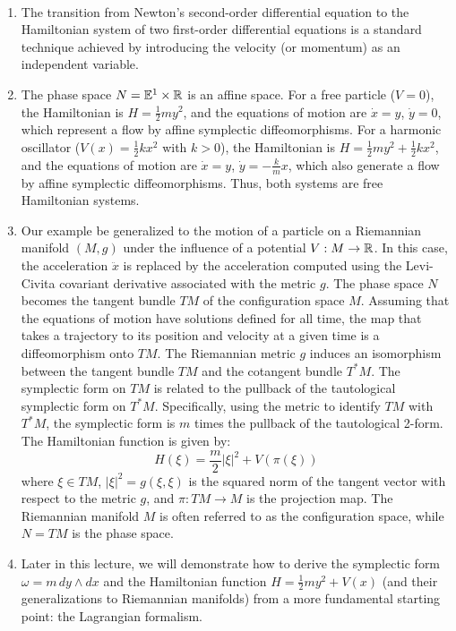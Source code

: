 \begin{remark}
\,
\begin{enumerate}
    \item The transition from Newton's second-order differential equation to the Hamiltonian system of two first-order differential equations is a standard technique achieved by introducing the velocity (or momentum) as an independent variable.
    \item The phase space $N = \mathbb{E}^1 \times \mathbb{R}$ is an affine space. For a free particle ($V=0$), the Hamiltonian is $H = \frac{1}{2}my^2$, and the equations of motion are $\dot{x} = y$, $\dot{y} = 0$, which represent a flow by affine symplectic diffeomorphisms. For a harmonic oscillator ($V(x) = \frac{1}{2}kx^2$ with $k > 0$), the Hamiltonian is $H = \frac{1}{2}my^2 + \frac{1}{2}kx^2$, and the equations of motion are $\dot{x} = y$, $\dot{y} = -\frac{k}{m}x$, which also generate a flow by affine symplectic diffeomorphisms. Thus, both systems are free Hamiltonian systems.
    \item Our example be generalized to the motion of a particle on a Riemannian manifold $(M, g)$ under the influence of a potential $V: M \rightarrow \mathbb{R}$. In this case, the acceleration $\ddot{x}$ is replaced by the acceleration computed using the Levi-Civita covariant derivative associated with the metric $g$. The phase space $N$ becomes the tangent bundle $TM$ of the configuration space $M$. Assuming that the equations of motion have solutions defined for all time, the map that takes a trajectory to its position and velocity at a given time is a diffeomorphism onto $TM$. The Riemannian metric $g$ induces an isomorphism between the tangent bundle $TM$ and the cotangent bundle $T^*M$. The symplectic form on $TM$ is related to the pullback of the tautological symplectic form on $T^*M$. Specifically, using the metric to identify $TM$ with $T^*M$, the symplectic form is $m$ times the pullback of the tautological 2-form. The Hamiltonian function is given by:
    \[ H(\xi) = \frac{m}{2} |\xi|^2 + V(\pi(\xi)) \]
    where $\xi \in TM$, $|\xi|^2 = g(\xi, \xi)$ is the squared norm of the tangent vector with respect to the metric $g$, and $\pi: TM \rightarrow M$ is the projection map. The Riemannian manifold $M$ is often referred to as the configuration space, while $N = TM$ is the phase space.
    \item Later in this lecture, we will demonstrate how to derive the symplectic form $\omega = m \, dy \wedge dx$ and the Hamiltonian function $H = \frac{1}{2}my^2 + V(x)$ (and their generalizations to Riemannian manifolds) from a more fundamental starting point: the Lagrangian formalism.
\end{enumerate}
\end{remark}


